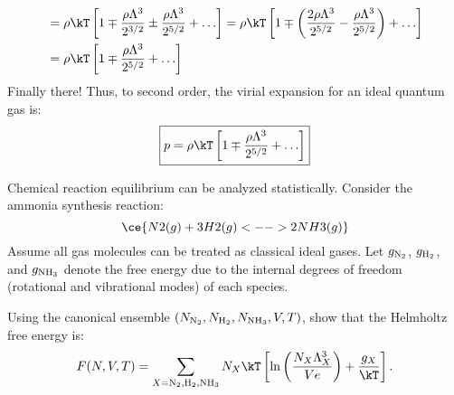 {\begin{align*}
    &= \rho \kT \left[ 1 \mp \frac{\rho \Lambda^3}{2^{3/2}} 
                         \pm \frac{\rho \Lambda^3}{2^{5/2}} 
                           + \ldots \right]
     = \rho \kT \left[ 1 \mp \left( \frac{2 \rho \Lambda^3}{2^{5/2}} 
                                   -\frac{\rho \Lambda^3}{2^{5/2}} \right)
                           + \ldots \right] \\
    &= \rho \kT \left[ 1 \mp \frac{\rho \Lambda^3}{2^{5/2}} + \ldots \right]
\end{align*}
Finally there! Thus, to second order, 
the virial expansion for an ideal quantum gas is:
\[ \boxed{ p = \rho \kT 
   \left[  1 \mp \frac{\rho \Lambda^3}{2^{5/2}} + \ldots \right] } \]
}

\bigskip
{}
Chemical reaction equilibrium can be analyzed statistically.
Consider the ammonia synthesis reaction:
\[ \ce{N2(g) + 3H2(g) <--> 2NH3(g)} \]
Assume all gas molecules can be treated
as classical ideal gases.
Let $g_{\rm N_2}$, $g_{\rm H_2}$,
and $g_{\rm NH_3}$
denote the free energy
due to the internal degrees of freedom
(rotational and vibrational modes)
of each species.

\smallskip \subp
Using the canonical ensemble
$(N_{\rm N_2}, N_{\rm H_2}, N_{\rm NH_3}, V, T)$,
show that the Helmholtz free energy is:
\begin{align*}
F(N,V,T)
 = \sum_{X={\rm N_2, H_2, NH_3}}
    N_X \kT \left[ \ln\left( \frac{N_X \Lambda_X^3}{V e} \right)
    + \frac{g_{X}}{\kT} \right] .
\end{align*}

